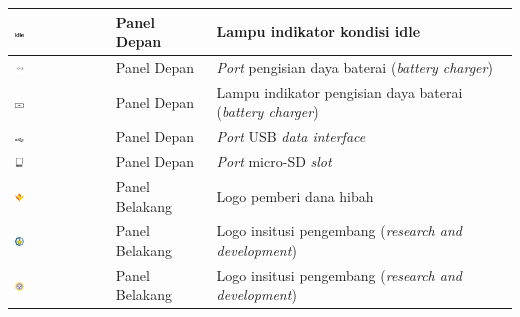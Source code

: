 \documentclass[11pt,a4paper,twoside,onecolumn]{book}
\begin{document}
\begin{table}
\begin{tabular}{| p{0.2\linewidth} | p{0.2\linewidth}| p{0.6\linewidth}|}
				\hline
				\includegraphics[width=0.1\textwidth]{images/idle} & Panel Depan & Lampu indikator kondisi idle\\
				\hline
				\includegraphics[width=0.1\textwidth]{images/charging-port} & Panel Depan & \emph{Port} pengisian daya baterai (\emph{battery charger})\\
				\hline
				\includegraphics[width=0.1\textwidth]{images/charging-indicator} & Panel Depan & Lampu indikator pengisian daya baterai (\emph{battery charger})\\
				\hline
				\includegraphics[width=0.1\textwidth]{images/usb-data-interface} & Panel Depan & \emph{Port} USB \emph{data interface}\\
				\hline
				\includegraphics[width=0.1\textwidth]{images/micro-SD} & Panel Depan & \emph{Port} micro-SD \emph{slot}\\
				\hline
				\includegraphics[width=0.1\textwidth]{images/lpdp} & Panel Belakang & Logo pemberi dana hibah\\
				\hline
				\includegraphics[width=0.1\textwidth]{images/its} & Panel Belakang & Logo insitusi pengembang (\emph{research and development})\\
				\hline
				\includegraphics[width=0.1\textwidth]{images/unair} & Panel Belakang & Logo insitusi pengembang (\emph{research and development})\\

\end{tabular}
\end{table}
\end{document}
